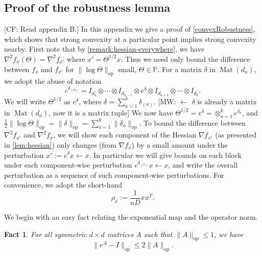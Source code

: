 \documentclass[aos]{imsart}
\newtheorem{fact}[theorem]{Fact}
\theoremstyle{definition}
\numberwithin{equation}{section}
\DeclareMathOperator{\op}{op}
\DeclareMathOperator{\Mat}{Mat}
\renewcommand{\P}{{\mathbb{P}}}
\newcommand{\samp}{x}
\newcommand{\CF}[1]{{\color{purple}[CF: #1]}}
\newcommand{\MW}[1]{{\color{red}[MW: #1]}}
\newcommand{\CF}[1]{{}}
\newcommand{\MW}[1]{{}}
\begin{document}
\begin{appendix}
\section{Proof of the robustness lemma}\label{app:robust}
\CF{Read appendix B.}
In this appendix we give a proof of \cref{convexRobustness}, which shows that strong convexity at a particular point implies strong convexity nearby.
First note that by \cref{remark:hessian-everywhere}, we have $\nabla^2 f_\samp(\Theta) = \nabla^2 f_{\samp'}$ where $\samp' = \Theta^{1/2} \samp$.
Thus we need only bound the difference between $f_\samp$ and $f_{\samp'}$ for $\|\log \Theta\|_{\op}$ small, $\Theta \in \P$.
For a matrix $\delta$ in $\Mat(d_a)$, we adopt the abuse of notation
$$e^{\delta_{(a)}} = I_{d_1} \otimes \cdots \otimes I_{d_{a-1}} \otimes e^{\delta} \otimes I_{d_{a+1}} \otimes \cdots \otimes I_{d_k}.$$
We will write $\Theta^{1/2}$ as $e^{\delta}$, where $\delta = \sum_{a =1}^k \delta_{(a)}$.
\MW{$\leftarrow$ $\delta$ is already a matrix in $\Mat(d_a)$, now it is a matrix tuple}
We now have $\Theta^{1/2} = e^{\delta} = \otimes_{a = 1}^k e^{\delta_a}$, and $\frac{1}{2}\|\log \Theta\|_{\op} = \|\delta\|_{\op} = \sum_{a =1}^k \|\delta_{a}\|_{\op}$.
To bound the difference between $\nabla^2 f_{x'}$ and $\nabla^2 f_x$, we will show each component of the Hessian $\nabla f_{x'}$ (as presented in \cref{lem:hessian}) only changes (from $\nabla f_x$) by a small amount under the perturbation $x' := e^\delta x \leftarrow x$.
In particular we will give bounds on each block under each component-wise perturbation $e^{\delta_{(a)}}x \leftarrow x$, and write the overall perturbation as a sequence of such component-wise perturbations. For convenience, we adopt the short-hand
$$ \rho_x:= \frac{1}{nD} x x^T.$$



We begin with an easy fact relating the exponential map and the operator norm.

\begin{fact} \label{f:expTaylor} For all symmetric $d\times d$ matrices $A$ such that $ \|A\|_{\op} \leq 1$, we have
$$ \|e^{A} - I\|_{\op} \leq 2 \|A\|_{\op}.$$
\end{fact}



\end{appendix}
\end{document}
